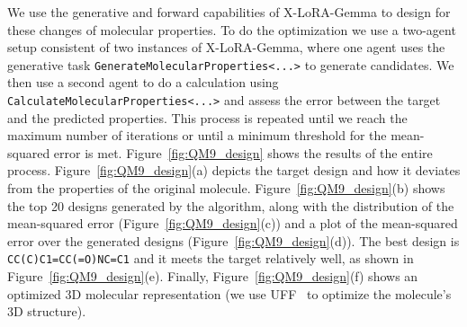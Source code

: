 \documentclass{article}
\begin{document}
We use the generative and forward capabilities of X-LoRA-Gemma to design for these changes of molecular properties. 
%
To do the optimization we use a two-agent setup consistent of two instances of X-LoRA-Gemma, where one agent uses the generative task \texttt{GenerateMolecularProperties<...>} to generate candidates. We then use a second agent to do a calculation using \texttt{CalculateMolecularProperties<...>} and assess the error between the target and the predicted properties. This process is repeated until we reach the maximum number of iterations or until a minimum threshold for the mean-squared error is met.  
%
Figure~\ref{fig:QM9_design} shows the results of the entire process. Figure~\ref{fig:QM9_design}(a) depicts the target design and how it deviates from the properties of the original molecule. Figure~\ref{fig:QM9_design}(b) shows the top 20 designs generated by the algorithm, along with the distribution of the mean-squared error (Figure~\ref{fig:QM9_design}(c)) and a plot of the mean-squared error over the generated designs (Figure~\ref{fig:QM9_design}(d)). The best design is \texttt{CC(C)C1=CC(=O)NC=C1} and it meets the target relatively well, as shown in Figure~\ref{fig:QM9_design}(e). Finally, Figure~\ref{fig:QM9_design}(f) shows an optimized 3D molecular representation (we use UFF~\cite{Rappe1992UFFSimulations} to optimize the molecule's 3D structure). 
\end{document}
